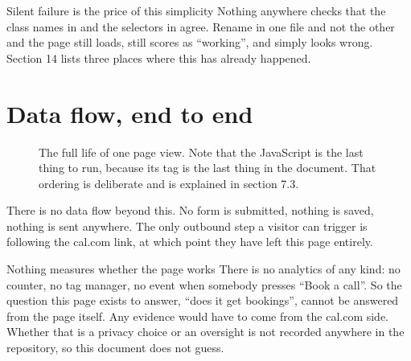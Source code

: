 \documentclass[11pt,a4paper]{article}
\begin{document}
\begin{honest}{Silent failure is the price of this simplicity}
Nothing anywhere checks that the class names in  and the
selectors in  agree. Rename  in one file and not
the other and the page still loads, still scores as ``working'', and simply looks
wrong. Section 14 lists three places where this has already happened.
\end{honest}

\section{Data flow, end to end}

\begin{figure}[H]\centering
{}
\caption{The full life of one page view. Note that the JavaScript is the last
thing to run, because its  tag is the last thing in the document.
That ordering is deliberate and is explained in section 7.3.}
\end{figure}

There is no data flow beyond this. No form is submitted, nothing is saved,
nothing is sent anywhere. The only outbound step a visitor can trigger is
following the cal.com link, at which point they have left this page entirely.

\begin{honest}{Nothing measures whether the page works}
There is no analytics of any kind: no counter, no tag manager, no event when
somebody presses ``Book a call''. So the question this page exists to answer,
``does it get bookings'', cannot be answered from the page itself. Any evidence
would have to come from the cal.com side. Whether that is a privacy choice or an
oversight is not recorded anywhere in the repository, so this document does not
guess.
\end{honest}
\end{document}
